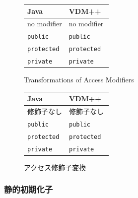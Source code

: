 \documentclass[\pformat,12pt]{jarticle}
\newcommand{\JAVA}{Java}
\newcommand{\VDM}{VDM++}
\begin{document}
\begin{figure}[htbp]
  \begin{center}
\begin{longtable}{|l|l|}
\hline
  \JAVA\   & \VDM\ \\ \hline \hline
  no modifier         & no modifier        \\ \hline
  \texttt{public}     & \texttt{public}    \\ \hline
  \texttt{protected}  & \texttt{protected} \\ \hline
  \texttt{private}  & \texttt{private} \\ \hline
\end{longtable}    
    \caption{Transformations of Access Modifiers}
    \label{fig:accessxfs}
  \end{center}
\end{figure}
\begin{figure}[htbp]
  \begin{center}
\begin{longtable}{|l|l|}
\hline
  \JAVA\   & \VDM\ \\ \hline \hline
  修飾子なし         & 修飾子なし        \\ \hline
  \texttt{public}     & \texttt{public}    \\ \hline
  \texttt{protected}  & \texttt{protected} \\ \hline
  \texttt{private}  & \texttt{private} \\ \hline
\end{longtable}    
    \caption{アクセス修飾子変換}
    \label{fig:accessxfs}
  \end{center}
\end{figure}


\subsubsection{静的初期化子}
\end{document}
